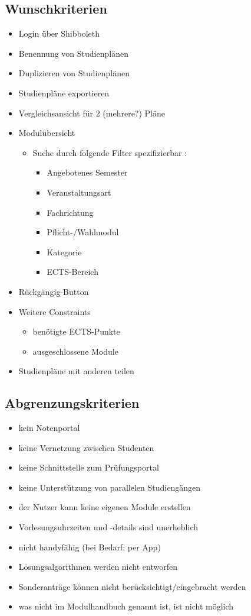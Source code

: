 \subsection{Wunschkriterien}
\label{subsec:project_goals-wunschkriterien}
\begin{itemize}[nosep]
	\item  Login über Shibboleth	
	\item Benennung von Studienplänen
	\item Duplizieren von Studienplänen
	\item Studienpläne exportieren
	\item Vergleichsansicht für 2 (mehrere?) Pläne 
	\item Modulübersicht
	\begin{itemize}[nosep]	
		\item Suche durch folgende Filter spezifizierbar : 
		\begin{itemize}[nosep]
			\item Angebotenes Semester
			\item Veranstaltungsart
			\item Fachrichtung
			\item Pflicht-/Wahlmodul
			\item Kategorie
			\item ECTS-Bereich
		\end{itemize}
	\end{itemize}
	\item Rückgängig-Button
	\item Weitere Constraints
	\begin{itemize}[nosep]
		\item benötigte ECTS-Punkte
		\item ausgeschlossene Module
	\end{itemize}
	\item Studienpläne mit anderen teilen
\end{itemize}
\subsection{Abgrenzungskriterien}
\begin{itemize}[nosep]
	\item kein Notenportal
	\item keine Vernetzung zwischen Studenten
	\item keine Schnittstelle zum Prüfungsportal
	\item keine Unterstützung von parallelen Studiengängen
	\item der Nutzer kann keine eigenen Module erstellen
	\item Vorlesungsuhrzeiten und -details sind unerheblich
	\item nicht handyfähig (bei Bedarf: per App)
	\item Lösungsalgorithmen werden nicht entworfen
	\item Sonderanträge können nicht berücksichtigt/eingebracht werden
	\item was nicht im Modulhandbuch genannt ist, ist nicht möglich
\end{itemize}